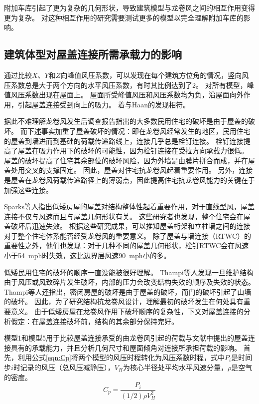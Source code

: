 \documentclass{ctexart}
\begin{document}
附加车库引起了更为复杂的几何形状，导致建筑模型与龙卷风之间的相互作用变得更为复杂。
对这种相互作用的研究需要测试更多的模型以完全理解附加车库的影响。

\subsection{建筑体型对屋盖连接所需承载力的影响}
通过比较$X$、$Y$和$Z$向峰值风压系数，可以发现在每个建筑方位角的情况，竖向风压系数总是大于两个方向的水平风压系数，有时其比例达到了\num{2}。
对所有模型，峰值风压系数出现在屋面上。
屋面所受峰值风压和风压系数均为负，沿屋面向外作用，引起屋盖连接受到向上的吸力。
着与Haan\cite{haan2009tornado}的发现相符。

据此不难理解龙卷风发生后调查报告指出的大多数民用住宅的破坏是由于屋盖的破坏。
而下述事实加重了屋盖破坏的情况：即在龙卷风经常发生的地区，民用住宅的屋盖到墙进而到基础的荷载传递路线上，连接几乎总是栓钉连接。
栓钉连接提高了屋盖在吸力作用下的破坏的可能性，因为栓钉连接在受拉方向承载力很低。
屋盖的破坏提高了住宅其余部位的破坏风险，因为外墙是由膜片拼合而成，并在屋盖处用交叉的支撑固定\cite{marshall2002tornado}。
因此，屋盖对住宅抗龙卷风起着重要作用。
另外，连接是屋盖在龙卷风荷载传递路径上的薄弱点，因此提高住宅抗龙卷风能力的关键在于加强这些连接。

Sparks等人\cite{sparks1988failure}指出低矮房屋的屋盖对结构整体性起着重要作用，对于直线型风，屋盖连接不仅与风速而且与屋盖几何形状有关。
这些研究者也发现，整个住宅会在屋盖破坏后迅速失效。
根据这些研究成果，可以推知屋盖桁架和立柱墙之间的连接对于整个住宅体系能否经受龙卷风的重要意义\cite{sparks1988failure}。
除了屋盖与墙连接（RTWC）的重要性之外，他们也发现：对于几种不同的屋盖几何形状，栓钉RTWC会在风速小于\SI{54}{mph}时失效，这比边界层风速\SI{90}{mph}小的多。

低矮民用住宅的破坏的顺序一直没能被很好理解。
Thampi等人\cite{thampi2011finite}发现一旦维护结构由于风压或风致碎片发生破坏，内部的压力会改变结构失效的顺序及失效的状态。
Thampi等人\cite{thampi2011finite}还指出，密闭房屋的破坏是由于屋盖的破坏，而门的破坏引起了山墙的破坏。
因此，为了研究结构抗龙卷风设计，理解最初的破坏发生在何处具有重要意义。
由于低矮房屋在龙卷风作用下破坏顺序的复杂性，下文对屋盖连接的分析假定：在屋盖连接破坏前，结构的其余部分保持完好。

模型1和模型5用于比较屋盖连接承受的由龙卷风引起的荷载与文献中提出的屋盖连接具有的承载能力，并且分析几何尺寸和屋面倾角对连接所承担荷载的影响。
首先，利用公式\eqref{eqn:Cp}将两个模型的风压时程转化为风压系数时程，式中$P_i$是时间步$i$时记录的风压（总风压减静压），$V_H$为核心半径处平均水平风速分量，$\rho$是空气的密度。
\begin{equation} \label{eqn:Cp}
C_p=\frac{P_i}{(1/2) \rho V_H^2}
\end{equation}



\printbibliography
\end{document}
